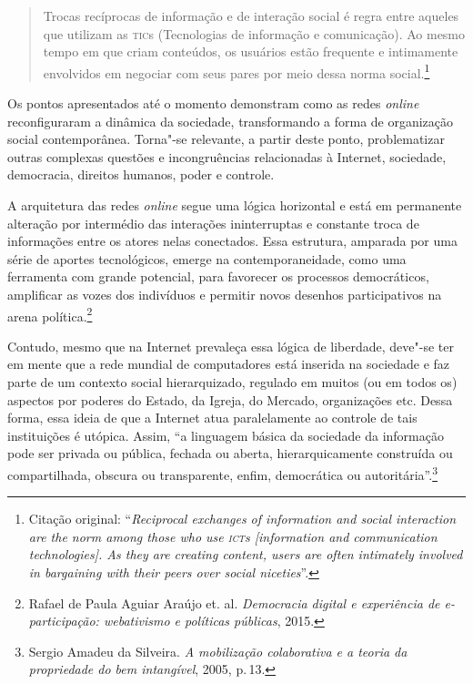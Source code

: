 \begin{quote}
Trocas recíprocas de informação e de interação social é regra entre
aqueles que utilizam as \textsc{tic}s (Tecnologias de informação e comunicação).
Ao mesmo tempo em que criam conteúdos, os usuários estão frequente e
intimamente envolvidos em negociar com seus pares por meio dessa norma
social.\footnote{Citação original: ``\emph{Reciprocal exchanges of information and social interaction are the norm among those who use \textsc{ict}s {[}information and communication
technologies{]}. As they are creating content, users are often
intimately involved in bargaining with their peers over social
niceties}''.}
\end{quote}

Os pontos apresentados até o momento demonstram como as redes \emph{online}
reconfiguraram a dinâmica da sociedade, transformando a forma de
organização social contemporânea. Torna"-se relevante, a partir deste
ponto, problematizar outras complexas questões e incongruências
relacionadas à Internet, sociedade, democracia, direitos humanos, poder
e controle.

A arquitetura das redes \emph{online} segue uma lógica horizontal e está em
permanente alteração por intermédio das interações ininterruptas e
constante troca de informações entre os atores nelas conectados. Essa
estrutura, amparada por uma série de aportes tecnológicos, emerge na
contemporaneidade, como uma ferramenta com grande potencial, para
favorecer os processos democráticos, amplificar as vozes dos indivíduos
e permitir novos desenhos participativos na arena política.\footnote{Rafael de Paula Aguiar Araújo et. al. \emph{Democracia digital e experiência de
e-participação: webativismo e políticas públicas}, 2015.}

Contudo, mesmo que na Internet prevaleça essa lógica de liberdade,
deve"-se ter em mente que a rede mundial de computadores está inserida na
sociedade e faz parte de um contexto social hierarquizado, regulado em
muitos (ou em todos os) aspectos por poderes do Estado, da Igreja, do
Mercado, organizações etc. Dessa forma, essa ideia de que a Internet
atua paralelamente ao controle de tais instituições é utópica. Assim,
``a linguagem básica da sociedade da informação pode ser privada ou
pública, fechada ou aberta, hierarquicamente construída ou
compartilhada, obscura ou transparente, enfim, democrática ou
autoritária''.\footnote{Sergio Amadeu da Silveira. \emph{A mobilização colaborativa e a
teoria da propriedade do bem intangível}, 2005, p.\,13.}

